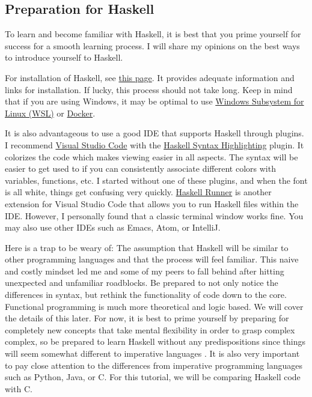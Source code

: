 \documentclass{article}
\begin{document}
\subsection{Preparation for Haskell}
\medskip\noindent
To learn and become familiar with Haskell, it is best that you prime yourself for success for a smooth learning process. I will share my opinions on the best ways to introduce yourself to Haskell.

\medskip\noindent
For installation of Haskell, see \href{https://hackmd.io/@alexhkurz/Hk86XnCzD}{this page}. It provides adequate information and links for installation. If lucky, this process should not take long. Keep in mind that if you are using Windows, it may be optimal to use \href{https://docs.microsoft.com/en-us/windows/wsl/install}{Windows Subsystem for Linux (WSL)} or \href{https://www.docker.com/get-started}{Docker}.

\medskip\noindent
It is also advantageous to use a good IDE that supports Haskell through plugins. I recommend \href{https://code.visualstudio.com/}{Visual Studio Code} with the \href{https://marketplace.visualstudio.com/items?itemName=justusadam.language-haskell}{Haskell Syntax Highlighting} plugin. It colorizes the code which makes viewing easier in all aspects. The syntax will be easier to get used to if you can consistently associate different colors with variables, functions, etc. I started without one of these plugins, and when the font is all white, things get confusing very quickly. \href{https://marketplace.visualstudio.com/items?itemName=Meowcolm024.has-go}{Haskell Runner} is another extension for Visual Studio Code that allows you to run Haskell files within the IDE. However, I personally found that a classic terminal window works fine. You may also use other IDEs such as Emacs, Atom, or IntelliJ.

\medskip\noindent
Here is a trap to be weary of: The assumption that Haskell will be similar to other programming languages and that the process will feel familiar. This naive and costly mindset led me and some of my peers to fall behind after hitting unexpected and unfamiliar roadblocks. Be prepared to not only notice the differences in syntax, but rethink the functionality of code down to the core. Functional programming is much more theoretical and logic based. We will cover the details of this later. For now, it is best to prime yourself by preparing for completely new concepts that take mental flexibility in order to grasp complex complex, so be prepared to learn Haskell without any predispositions since things will seem somewhat different to imperative languages \cite{HI}. It is also very important to pay close attention to the differences from imperative programming languages such as Python, Java, or C. For this tutorial, we will be comparing Haskell code with C.
\end{document}
